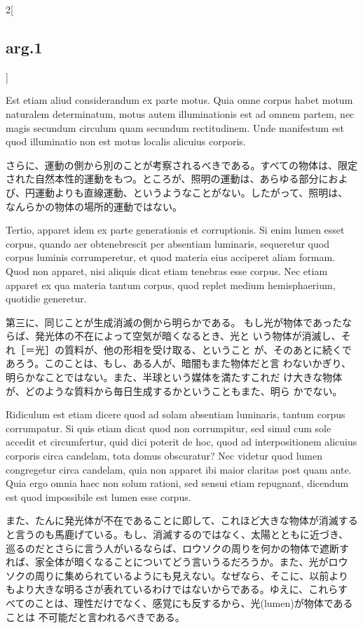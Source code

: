 \documentclass[paper=a4paper,fontsize=10pt,jafontsize=9pt,titlepage]{jlreq}
\begin{document}
\begin{paracol}{2}[\subsection{arg.1}]
\switchcolumn*

Est etiam
aliud considerandum ex parte motus. Quia omne corpus habet motum
naturalem determinatum, motus autem illuminationis est ad omnem partem,
nec magis secundum circulum quam secundum rectitudinem. Unde manifestum
est quod illuminatio non est motus localis alicuius corporis.

\switchcolumn

さらに、運動の側から別のことが考察されるべきである。すべての物体は、限定
 された自然本性的運動をもつ。ところが、照明の運動は、あらゆる部分におよ
 び、円運動よりも直線運動、というようなことがない。したがって、照明は、
 なんらかの物体の場所的運動ではない。

\switchcolumn*

Tertio,
apparet idem ex parte generationis et corruptionis. Si enim lumen esset
corpus, quando aer obtenebrescit per absentiam luminaris, sequeretur
quod corpus luminis corrumperetur, et quod materia eius acciperet aliam
formam. Quod non apparet, nisi aliquis dicat etiam tenebras esse
corpus. Nec etiam apparet ex qua materia tantum corpus, quod replet
medium hemisphaerium, quotidie generetur.

\switchcolumn

第三に、同じことが生成消滅の側から明らかである。
もし光が物体であったならば、発光体の不在によって空気が暗くなるとき、光と
 いう物体が消滅し、それ［＝光］の質料が、他の形相を受け取る、ということ
 が、そのあとに続くであろう。このことは、もし、ある人が、暗闇もまた物体だと言
 わないかぎり、明らかなことではない。また、半球という媒体を満たすこれだ
 け大きな物体が、どのような質料から毎日生成するかということもまた、明ら
 かでない。

\switchcolumn*

Ridiculum est etiam dicere
quod ad solam absentiam luminaris, tantum corpus corrumpatur. Si quis
etiam dicat quod non corrumpitur, sed simul cum sole accedit et
circumfertur, quid dici poterit de hoc, quod ad interpositionem alicuius
corporis circa candelam, tota domus obscuratur? Nec videtur quod lumen
congregetur circa candelam, quia non apparet ibi maior claritas post
quam ante. Quia ergo omnia haec non solum rationi, sed sensui etiam
repugnant, dicendum est quod impossibile est lumen esse corpus.

\switchcolumn

また、たんに発光体が不在であることに即して、これほど大きな物体が消滅する
 と言うのも馬鹿げている。もし、消滅するのではなく、太陽とともに近づき、
 巡るのだとさらに言う人がいるならば、ロウソクの周りを何かの物体で遮断す
 れば、家全体が暗くなることについてどう言いうるだろうか。また、光がロウ
 ソクの周りに集められているようにも見えない。なぜなら、そこに、以前より
 もより大きな明るさが表れているわけではないからである。ゆえに、これらす
 べてのことは、理性だけでなく、感覚にも反するから、光(lumen)が物体であることは
 不可能だと言われるべきである。


\end{paracol}
\end{document}

